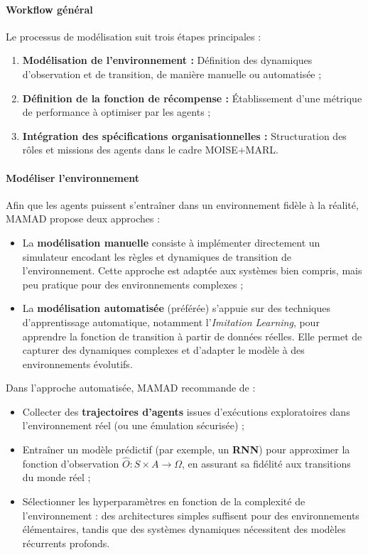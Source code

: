 \paragraph{Workflow général}

Le processus de modélisation suit trois étapes principales :
\begin{enumerate}
    \item \textbf{Modélisation de l'environnement :} Définition des dynamiques d'observation et de transition, de manière manuelle ou automatisée ;
    \item \textbf{Définition de la fonction de récompense :} Établissement d'une métrique de performance à optimiser par les agents ;
    \item \textbf{Intégration des spécifications organisationnelles :} Structuration des rôles et missions des agents dans le cadre MOISE+MARL.
\end{enumerate}

\paragraph{Modéliser l'environnement}

Afin que les agents puissent s'entraîner dans un environnement fidèle à la réalité, MAMAD propose deux approches :
\begin{itemize}
    \item La \textbf{modélisation manuelle} consiste à implémenter directement un simulateur encodant les règles et dynamiques de transition de l'environnement. Cette approche est adaptée aux systèmes bien compris, mais peu pratique pour des environnements complexes ;
          
    \item La \textbf{modélisation automatisée} (préférée) s'appuie sur des techniques d'apprentissage automatique, notamment l'\textit{Imitation Learning}, pour apprendre la fonction de transition à partir de données réelles. Elle permet de capturer des dynamiques complexes et d'adapter le modèle à des environnements évolutifs.
\end{itemize}

Dans l'approche automatisée, MAMAD recommande de :
\begin{itemize}
    \item Collecter des \textbf{trajectoires d'agents} issues d'exécutions exploratoires dans l'environnement réel (ou une émulation sécurisée) ;
    \item Entraîner un modèle prédictif (par exemple, un \textbf{RNN}) pour approximer la fonction d'observation $\hat{O}: S \times A \to \Omega$, en assurant sa fidélité aux transitions du monde réel ;
    \item Sélectionner les hyperparamètres en fonction de la complexité de l'environnement : des architectures simples suffisent pour des environnements élémentaires, tandis que des systèmes dynamiques nécessitent des modèles récurrents profonds.
\end{itemize}

